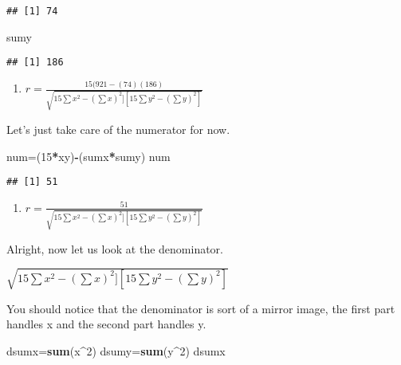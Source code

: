 \documentclass[]{article}
\newenvironment{Shaded}{\begin{snugshade}}{\end{snugshade}}
\newcommand{\KeywordTok}[1]{\textcolor[rgb]{0.13,0.29,0.53}{\textbf{#1}}}
\newcommand{\DecValTok}[1]{\textcolor[rgb]{0.00,0.00,0.81}{#1}}
\newcommand{\OperatorTok}[1]{\textcolor[rgb]{0.81,0.36,0.00}{\textbf{#1}}}
\newcommand{\NormalTok}[1]{#1}
\providecommand{\tightlist}{%
  \setlength{\itemsep}{0pt}\setlength{\parskip}{0pt}}
\begin{document}
\begin{verbatim}
## [1] 74
\end{verbatim}

\begin{Shaded}
\begin{Highlighting}[]
\NormalTok{sumy}
\end{Highlighting}
\end{Shaded}

\begin{verbatim}
## [1] 186
\end{verbatim}

\begin{enumerate}
\def\labelenumi{\arabic{enumi}.}
\setcounter{enumi}{3}
\tightlist
\item
  \(r = \frac{15(921-(74)(186)}{\sqrt{15 \sum x ^2-(\sum x)^2][15 \sum y ^2-(\sum y)^2]}}\)
\end{enumerate}

Let's just take care of the numerator for now.

\begin{Shaded}
\begin{Highlighting}[]
\NormalTok{num=(}\DecValTok{15}\OperatorTok{*}\NormalTok{xy)}\OperatorTok{-}\NormalTok{(sumx}\OperatorTok{*}\NormalTok{sumy)}
\NormalTok{num}
\end{Highlighting}
\end{Shaded}

\begin{verbatim}
## [1] 51
\end{verbatim}

\begin{enumerate}
\def\labelenumi{\arabic{enumi}.}
\setcounter{enumi}{4}
\tightlist
\item
  \(r = \frac{51}{\sqrt{15 \sum x ^2-(\sum x)^2][15 \sum y ^2-(\sum y)^2]}}\)
\end{enumerate}

Alright, now let us look at the denominator.

\({\sqrt{15 \sum x ^2-(\sum x)^2][15 \sum y ^2-(\sum y)^2]}}\)

You should notice that the denominator is sort of a mirror image, the
first part handles x and the second part handles y.

\begin{Shaded}
\begin{Highlighting}[]
\NormalTok{dsumx=}\KeywordTok{sum}\NormalTok{(x}\OperatorTok{^}\DecValTok{2}\NormalTok{)}
\NormalTok{dsumy=}\KeywordTok{sum}\NormalTok{(y}\OperatorTok{^}\DecValTok{2}\NormalTok{)}
\NormalTok{dsumx}
\end{Highlighting}
\end{Shaded}
\end{document}

